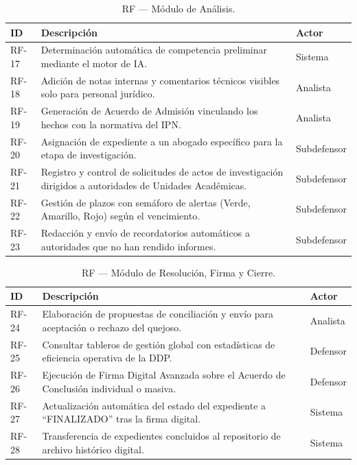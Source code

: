 \documentclass[12pt, oneside, letterpaper]{book}
\begin{document}
\begin{table}[H]
\centering
\caption{RF — Módulo de Análisis.}
\begin{tabularx}{\textwidth}{@{} l L l @{}}
\toprule
{}
\textbf{\color{white} ID} & \textbf{\color{white} Descripción} & \textbf{\color{white} Actor} \\ \midrule
{}
RF-17 & Determinación automática de competencia preliminar mediante el motor de IA. & Sistema \\
RF-18 & Adición de notas internas y comentarios técnicos visibles solo para personal jurídico. & Analista \\
RF-19 & Generación de Acuerdo de Admisión vinculando los hechos con la normativa del IPN. & Analista \\
RF-20 & Asignación de expediente a un abogado específico para la etapa de investigación. & Subdefensor \\
RF-21 & Registro y control de solicitudes de actos de investigación dirigidos a autoridades de Unidades Académicas. & Subdefensor \\
RF-22 & Gestión de plazos con semáforo de alertas (Verde, Amarillo, Rojo) según el vencimiento. & Subdefensor \\
RF-23 & Redacción y envío de recordatorios automáticos a autoridades que no han rendido informes. & Subdefensor \\ \bottomrule
\end{tabularx}
\end{table}

\begin{table}[H]
\centering
\caption{RF — Módulo de Resolución, Firma y Cierre.}
\begin{tabularx}{\textwidth}{@{} l L l @{}}
\toprule
{}
\textbf{\color{white} ID} & \textbf{\color{white} Descripción} & \textbf{\color{white} Actor} \\ \midrule
{}
RF-24 & Elaboración de propuestas de conciliación y envío para aceptación o rechazo del quejoso. & Analista \\
RF-25 & Consultar tableros de gestión global con estadísticas de eficiencia operativa de la DDP. & Defensor \\
RF-26 & Ejecución de Firma Digital Avanzada sobre el Acuerdo de Conclusión individual o masiva. & Defensor \\
RF-27 & Actualización automática del estado del expediente a ``FINALIZADO'' tras la firma digital. & Sistema \\
RF-28 & Transferencia de expedientes concluidos al repositorio de archivo histórico digital. & Sistema \\ \bottomrule
\end{tabularx}
\end{table}
\end{document}
